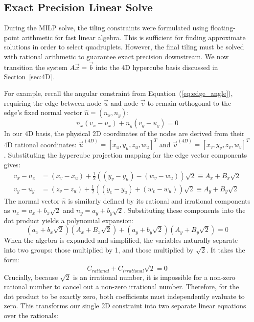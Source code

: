 \documentclass[11pt]{article}
\begin{document}
\subsection{Exact Precision Linear Solve}
During the MILP solve, the tiling constraints were formulated using floating-point arithmetic for fast linear algebra. This is sufficient for finding approximate solutions in order to select quadruplets. However, the final tiling must be solved with rational arithmetic to guarantee exact precision downstream. We now transition the system $A\vec{x} = \vec{b}$ into the 4D hypercube basis discussed in Section~\ref{sec:4D}.

For example, recall the angular constraint from Equation~(\ref{eq:edge_angle}), requiring the edge between node $\vec{u}$ and node $\vec{v}$ to remain orthogonal to the edge's fixed normal vector $\hat{n} = (n_x, n_y)$:
\begin{equation}
    n_x(v_x - u_x) + n_y(v_y - u_y) = 0
\end{equation}
In our 4D basis, the physical 2D coordinates of the nodes are derived from their 4D rational coordinates: $\vec{u}^{(4D)} = [x_u, y_u, z_u, w_u]^T$ and $\vec{v}^{(4D)} = {[x_v, y_v, z_v, w_v]}^T$. Substituting the hypercube projection mapping for the edge vector components gives:
\begin{align}
    v_x - u_x &= (x_v - x_u) + \frac{1}{2}((y_v-y_u) - (w_v-w_u))\sqrt{2} \equiv A_x + B_x \sqrt{2} \\
    v_y - u_y &= (z_v - z_u) + \frac{1}{2}((y_v-y_u) + (w_v-w_u))\sqrt{2} \equiv A_y + B_y \sqrt{2}
\end{align}
The normal vector $\hat{n}$ is similarly defined by its rational and irrational components as $n_x = a_x + b_x \sqrt{2}$ and $n_y = a_y + b_y \sqrt{2}$. Substituting these components into the dot product yields a polynomial expansion:
\begin{equation}
    (a_x + b_x \sqrt{2})(A_x + B_x \sqrt{2}) + (a_y + b_y \sqrt{2})(A_y + B_y \sqrt{2}) = 0
\end{equation}
When the algebra is expanded and simplified, the variables naturally separate into two groups: those multiplied by 1, and those multiplied by $\sqrt{2}$. It takes the form:
\begin{equation}
    C_{rational} + C_{irrational} \sqrt{2} = 0
\end{equation}
Crucially, because $\sqrt{2}$ is an irrational number, it is impossible for a non-zero rational number to cancel out a non-zero irrational number. Therefore, for the dot product to be exactly zero, both coefficients must independently evaluate to zero. This transforms our single 2D constraint into two separate linear equations over the rationals:
\end{document}
